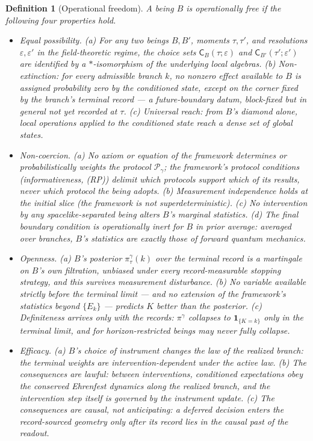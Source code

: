 \documentclass[11pt]{article}
\newtheorem{definition}{Definition}
\newcommand{\PP}{\mathcal P}
\begin{document}
\begin{definition}[Operational freedom]\label{def:freedom}
A being $B$ is \emph{operationally free} if the following four properties hold.
\begin{itemize}
\item[\textbf{(F1)}] \emph{Equal possibility.}
  (a) For any two beings $B,B'$, moments $\tau,\tau'$, and resolutions
  $\varepsilon,\varepsilon'$ in the field-theoretic regime, the choice sets
  $\mathsf C_B(\tau;\varepsilon)$ and $\mathsf C_{B'}(\tau';\varepsilon')$ are
  identified by a $*$-isomorphism of the underlying local algebras.
  (b) \emph{Non-extinction:} for every admissible branch $k$, no nonzero effect
  available to $B$ is assigned probability zero by the conditioned state, except
  on the corner fixed by the branch's terminal record --- a future-boundary
  datum, block-fixed but in general not yet recorded at $\tau$.
  (c) \emph{Universal reach:} from $B$'s diamond alone, local operations applied
  to the conditioned state reach a dense set of global states.
\item[\textbf{(F2)}] \emph{Non-coercion.}
  (a) No axiom or equation of the framework determines or probabilistically
  weights the protocol $\PP_\gamma$; the framework's protocol conditions
  (informativeness, (RP)) delimit which protocols support which of its
  results, never which protocol the being adopts.
  (b) Measurement independence holds at the initial slice (the framework is not
  superdeterministic).
  (c) No intervention by any spacelike-separated being alters $B$'s marginal
  statistics.
  (d) The final boundary condition is operationally inert for $B$ in prior
  average: averaged over branches, $B$'s statistics are exactly those of forward
  quantum mechanics.
\item[\textbf{(F3)}] \emph{Openness.}
  (a) $B$'s posterior $\pi^\gamma_\tau(k)$ over the terminal record is a
  martingale on $B$'s own filtration, unbiased under every record-measurable
  stopping strategy, and this survives measurement disturbance.
  (b) No variable available strictly before the terminal limit --- and no
  extension of the framework's statistics beyond $\{E_k\}$ --- predicts $K$
  better than the posterior.
  (c) Definiteness arrives only with the records: $\pi^\gamma$ collapses to
  $\mathbf 1_{\{K=k\}}$ only in the terminal limit, and for horizon-restricted
  beings may never fully collapse.
\item[\textbf{(F4)}] \emph{Efficacy.}
  (a) $B$'s choice of instrument changes the law of the realized branch:
  the terminal weights are intervention-dependent under the active law.
  (b) The consequences are lawful: between interventions, conditioned
  expectations obey the conserved Ehrenfest dynamics along the realized branch,
  and the intervention step itself is governed by the instrument update.
  (c) The consequences are causal, not anticipating: a deferred decision enters
  the record-sourced geometry only after its record lies in the causal past of
  the readout.
\end{itemize}
\end{definition}
\end{document}
